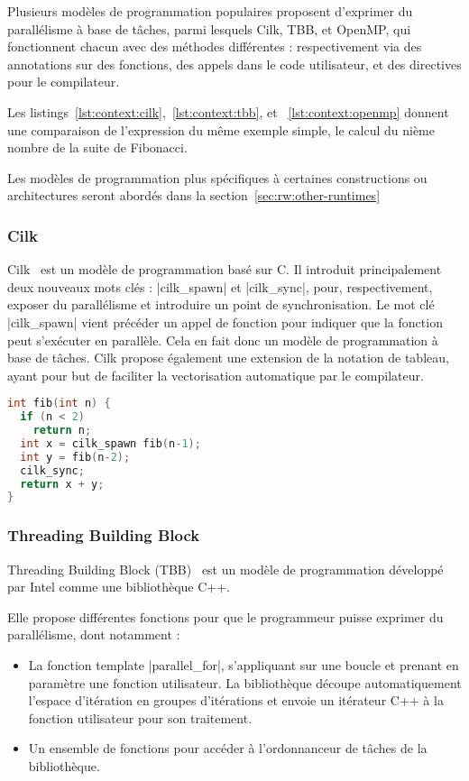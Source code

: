 Plusieurs modèles de programmation populaires proposent d'exprimer du parallélisme à base de tâches, parmi lesquels Cilk, TBB, et OpenMP, qui fonctionnent chacun avec des méthodes différentes : respectivement via des annotations sur des fonctions, des appels dans le code utilisateur, et des directives pour le compilateur.

Les listings~\ref{lst:context:cilk},~\ref{lst:context:tbb}, et ~\ref{lst:context:openmp} donnent une comparaison de l'expression du même exemple simple, le calcul du nième nombre de la suite de Fibonacci.

Les modèles de programmation plus spécifiques à certaines constructions ou architectures seront abordés dans la section~\ref{sec:rw:other-runtimes}

\subsubsection{Cilk}

Cilk~\cite{cilk5} est un modèle de programmation basé sur C.
Il introduit principalement deux nouveaux mots clés : |cilk_spawn| et |cilk_sync|, pour, respectivement, exposer du parallélisme et introduire un point de synchronisation.
Le mot clé |cilk_spawn| vient précéder un appel de fonction pour indiquer que la fonction peut s'exécuter en parallèle. Cela en fait donc un modèle de programmation à base de tâches.
Cilk propose également une extension de la notation de tableau, ayant pour but de faciliter la vectorisation automatique par le compilateur.


\begin{lstlisting}[language=c++,caption=Fibonacci exprimé en Cilk,label=lst:context:cilk]
int fib(int n) {
  if (n < 2)
    return n;
  int x = cilk_spawn fib(n-1);
  int y = fib(n-2);
  cilk_sync;
  return x + y;
}
\end{lstlisting}


\subsubsection{Threading Building Block}

Threading Building Block (TBB)~\cite{Reinders2007} est un modèle de programmation développé par Intel comme une bibliothèque C++.

Elle propose différentes fonctions pour que le programmeur puisse exprimer du parallélisme, dont notamment :
\begin{itemize}
  \item La fonction template |parallel_for|, s'appliquant sur une boucle et prenant en paramètre une fonction utilisateur.
    La bibliothèque découpe automatiquement l'espace d'itération en groupes d'itérations et envoie un itérateur C++ à la fonction utilisateur pour son traitement.
  \item Un ensemble de fonctions pour accéder à l'ordonnanceur de tâches de la bibliothèque.
\end{itemize}

